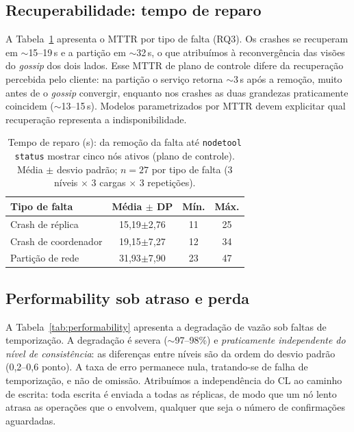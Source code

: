 \documentclass[runningheads]{llncs}
\begin{document}
\subsection{Recuperabilidade: tempo de reparo}

A Tabela~\ref{tab:mttr} apresenta o MTTR por tipo de falta (RQ3). Os crashes se
recuperam em $\sim$15--19\,s e a partição em $\sim$32\,s, o que atribuímos à
reconvergência das visões do \emph{gossip} dos dois lados. Esse MTTR de plano de
controle difere da recuperação percebida pelo cliente: na partição o serviço
retorna $\sim$3\,s após a remoção, muito antes de o \emph{gossip} convergir,
enquanto nos crashes as duas grandezas praticamente coincidem ($\sim$13--15\,s).
Modelos parametrizados por MTTR devem explicitar qual recuperação representa a
indisponibilidade.

\begin{table}[t]
\centering
\caption{Tempo de reparo (s): da remoção da falta até \texttt{nodetool status}
mostrar cinco nós ativos (plano de controle). Média $\pm$ desvio padrão; $n=27$
por tipo de falta (3 níveis $\times$ 3 cargas $\times$ 3 repetições).}
\label{tab:mttr}
\small
\setlength{\tabcolsep}{5pt}
\begin{tabular}{lccc}
\toprule
\textbf{Tipo de falta} & \textbf{Média $\pm$ DP} & \textbf{Mín.} & \textbf{Máx.} \\
\midrule
Crash de réplica     & 15,19$\pm$2,76 & 11 & 25 \\
Crash de coordenador & 19,15$\pm$7,27 & 12 & 34 \\
Partição de rede     & 31,93$\pm$7,90 & 23 & 47 \\
\bottomrule
\end{tabular}
\end{table}

\subsection{Performability sob atraso e perda}

A Tabela~\ref{tab:performability} apresenta a degradação de vazão sob faltas de
temporização. A degradação é severa ($\sim$97--98\%) e \emph{praticamente
independente do nível de consistência}: as diferenças entre níveis são da ordem
do desvio padrão (0,2--0,6 ponto). A taxa de erro permanece nula, tratando-se de
falha de temporização, e não de omissão. Atribuímos a independência do CL ao
caminho de escrita: toda escrita é enviada a todas as réplicas, de modo que um nó
lento atrasa as operações que o envolvem, qualquer que seja o número de
confirmações aguardadas.
\end{document}
